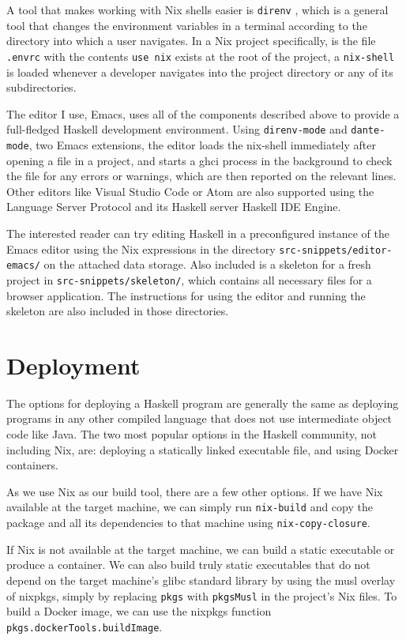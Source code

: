 \documentclass[english,zadani,odsaz]{fitthesis}
\begin{document}
A tool that makes working with Nix shells easier is \texttt{direnv} \cite{direnv}, which is
a general tool that changes the environment variables in a terminal according to
the directory into which a user navigates. In a Nix project specifically, is the
file \texttt{.envrc} with the contents \texttt{use nix} exists at the root of the project, a
\texttt{nix-shell} is loaded whenever a developer navigates into the project directory or
any of its subdirectories.

The editor I use, Emacs, uses all of the components described above to provide a
full-fledged Haskell development environment. Using \texttt{direnv-mode} and \texttt{dante-mode},
two Emacs extensions, the editor loads the nix-shell immediately after opening a
file in a project, and starts a ghci process in the background to check the file
for any errors or warnings, which are then reported on the relevant lines.
Other editors like Visual Studio Code or Atom are also supported using the
Language Server Protocol and its Haskell server Haskell IDE Engine.

The interested reader can try editing Haskell in a preconfigured instance of the
Emacs editor using the Nix expressions in the directory
\texttt{src-snippets/editor-emacs/} on the attached data storage. Also included is a
skeleton for a fresh project in \texttt{src-snippets/skeleton/}, which contains all
necessary files for a browser application. The instructions for using the editor
and running the skeleton are also included in those directories.

\section{Deployment}
\label{sec:org02940bb}
The options for deploying a Haskell program are generally the same as deploying
programs in any other compiled language that does not use intermediate object
code like Java. The two most popular options in the Haskell community, not
including Nix, are: deploying a statically linked executable file, and using
Docker containers.

As we use Nix as our build tool, there are a few other options. If we have Nix
available at the target machine, we can simply run \texttt{nix-build} and copy the
package and all its dependencies to that machine using \texttt{nix-copy-closure}.

If Nix is not available at the target machine, we can build a static executable
or produce a container. We can also build truly static executables that do not
depend on the target machine's glibc standard library by using the musl overlay
of nixpkgs, simply by replacing \texttt{pkgs} with \texttt{pkgsMusl} in the project's Nix files.
To build a Docker image, we can use the nixpkgs function
\texttt{pkgs.dockerTools.buildImage}.
\end{document}
